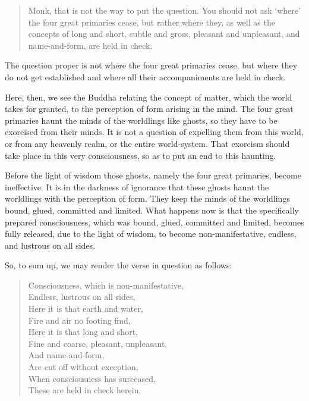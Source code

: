 \begin{quote}
Monk, that is not the way to put the question. You should not ask `where' the four great primaries cease, but rather where they, as well as the concepts of long and short, subtle and gross, pleasant and unpleasant, and name-and-form, are held in check.
\end{quote}

The question proper is not where the four great primaries cease, but where they do not get established and where all their accompaniments are held in check.

Here, then, we see the Buddha relating the concept of matter, which the world takes for granted, to the perception of form arising in the mind. The four great primaries haunt the minds of the worldlings like ghosts, so they have to be exorcised from their minds. It is not a question of expelling them from this world, or from any heavenly realm, or the entire world-system. That exorcism should take place in this very consciousness, so as to put an end to this haunting.

Before the light of wisdom those ghosts, namely the four great primaries, become ineffective. It is in the darkness of ignorance that these ghosts haunt the worldlings with the perception of form. They keep the minds of the worldlings bound, glued, committed and limited. What happens now is that the specifically prepared consciousness, which was bound, glued, committed and limited, becomes fully released, due to the light of wisdom, to become non-manifestative, endless, and lustrous on all sides.

So, to sum up, we may render the verse in question as follows:

\begin{quote}
Consciousness, which is non-manifestative,\\
Endless, lustrous on all sides,\\
Here it is that earth and water,\\
Fire and air no footing find,\\
Here it is that long and short,\\
Fine and coarse, pleasant, unpleasant,\\
And name-and-form,\\
Are cut off without exception,\\
When consciousness has surceased,\\
These are held in check herein.
\end{quote}


